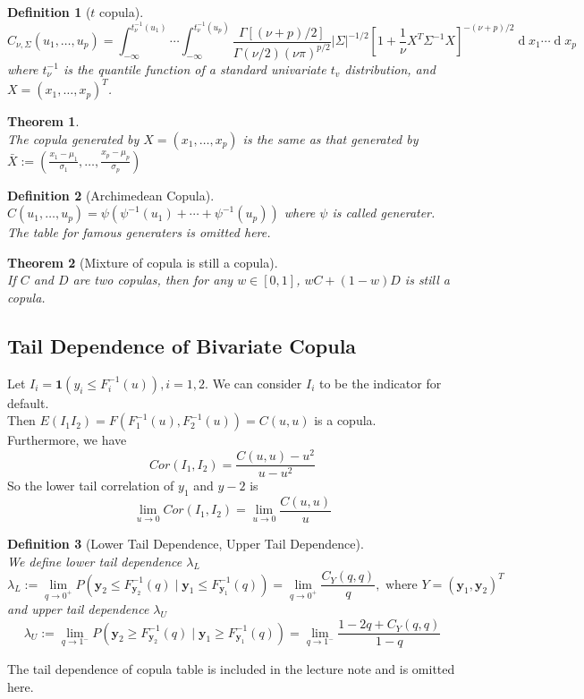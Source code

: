 \documentclass[12pt]{article}
\newtheorem{definition}{Definition}[section]
\newtheorem{theorem}{Theorem}[section]
\theoremstyle{definition}
\DeclareMathOperator{\diff}{d}
\begin{document}
\begin{definition}[{$t$} copula]
\hfill\\\normalfont 
\[
C_{\nu, \Sigma}(u_1,\ldots, u_p)=\int_{-\infty}^{t_\nu^{-1}(u_1)}\cdots \int_{-\infty}^{t_\nu^{-1}(u_p)}\frac{\Gamma[(\nu+p)/2]}{\Gamma(\nu/2)(\nu\pi)^{p/2}}|\Sigma|^{-1/2}[1+\frac{1}{\nu}X^T\Sigma^{-1}X]^{-(\nu+p)/2}\diff x_1\cdots \diff x_p
\]
where $t_\nu^{-1}$ is the quantile function of a standard univariate $t_v$ distribution, and $X = (x_1,\ldots, x_p)^T$.
\end{definition}
\begin{theorem}
\hfill\\\normalfont The copula generated by $X=(x_1,\ldots, x_p)$ is the same as that generated by $\bar{X}:=(\frac{x_1-\mu_1}{\sigma_1}, \ldots, \frac{x_p-\mu_p}{\sigma_p})$
\end{theorem}
\begin{definition}[Archimedean Copula]
\hfill\\\normalfont $C(u_1,\ldots, u_p)=\psi(\psi^{-1}(u_1) +\cdots + \psi^{-1}(u_p))$ where $\psi$ is called \textit{generater}.\\
The table for famous generaters is omitted here.
\end{definition}
\begin{theorem}[Mixture of copula is still a copula]
\hfill\\\normalfont If $C$ and $D$ are two copulas, then for any $w\in[0,1]$, $wC+(1-w)D$ is still a copula.
\end{theorem}
\subsection{Tail Dependence of Bivariate Copula}
Let $I_i = \mathbf{1}(y_i\leq F_i^{-1}(u)), i = 1,2$. We can consider $I_i$ to be the indicator for default.\\
Then $E(I_1I_2) = F(F_1^{-1}(u), F_2^{-1}(u)) = C(u,u)$ is a copula.\\
Furthermore, we have
\[
Cor(I_1, I_2) = \frac{C(u,u)-u^2}{u-u^2}
\]
So the lower tail correlation of $y_1$ and $y-2$ is
\[
\lim_{u\to 0} Cor(I_1,I_2)=\lim_{u\to 0}\frac{C(u,u)}{u}
\]
\begin{definition}[Lower Tail Dependence, Upper Tail Dependence]
\hfill\\\normalfont We define lower tail dependence $\lambda_L$ 
\[
\lambda_L := \lim_{q\to 0^+}P(\mathbf{y}_2\leq F_{\mathbf{y}_2}^{-1}(q)\mid \mathbf{y}_1\leq F_{\mathbf{y}_1}^{-1}(q)) = \lim_{q\to 0^+}\frac{C_Y(q,q)}{q},\text{ where }Y=(\mathbf{y}_1,\mathbf{y}_2)^T
\]
and upper tail dependence $\lambda_U$
\[
\lambda_U:=\lim_{q\to 1^-}P(\mathbf{y}_2\geq F_{\mathbf{y}_2}^{-1}(q)\mid \mathbf{y}_1\geq F_{\mathbf{y}_1}^{-1}(q)) =\lim_{q\to 1^{-}}\frac{1-2q + C_Y(q,q)}{1-q}
\]
\end{definition}
The tail dependence of copula table is included in the lecture note and is omitted here.
\end{document}
